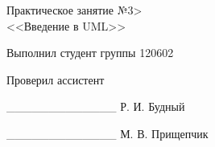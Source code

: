 \thispagestyle{empty}
\setlength{\parindent}{0ex} %

\begin{center}
  Практическое занятие №3> \\
  <<Введение в UML>>
\end{center}

\vspace{1\baselineskip}

\begin{minipage}{.5\linewidth}
    Выполнил студент группы 120602 

    \smallskip

    Проверил ассистент
\end{minipage}
\hfill
\begin{minipage}{.45\linewidth}
  \begin{flushright}
    \_\_\_\_\_\_\_\_\_\_\_\_\_ Р. И. Будный 

    \smallskip

    \_\_\_\_\_\_\_\_\_\_\_\_\_ М. В. Прищепчик 
  \end{flushright}
\end{minipage}

\setlength{\parindent}{1.25cm} %
